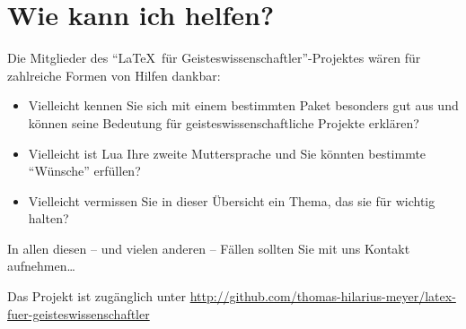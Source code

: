 \documentclass[ngerman]{dtk}
\begin{document}
\section{Wie kann ich helfen?}

Die Mitglieder des \enquote{\LaTeX\ für Geisteswissenschaftler}-Projektes wären für zahlreiche Formen von
Hilfen dankbar:

\begin{itemize}
    \item Vielleicht kennen Sie sich mit einem bestimmten Paket besonders gut aus und können seine Bedeutung
        für geisteswissenschaftliche Projekte erklären?
    \item Vielleicht ist Lua Ihre zweite Muttersprache und Sie könnten bestimmte \enquote{Wünsche} erfüllen?
    \item Vielleicht vermissen Sie in dieser Übersicht ein Thema, das sie für wichtig halten?
\end{itemize} 

In allen diesen -- und vielen anderen -- Fällen sollten Sie mit uns Kontakt aufnehmen\ldots

Das Projekt ist zugänglich unter \url{http://github.com/thomas-hilarius-meyer/latex-fuer-geisteswissenschaftler}
\end{document}
